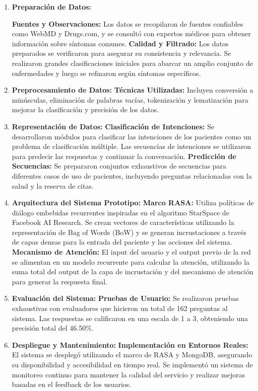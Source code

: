 	\begin{enumerate}
		
		\item \textbf{Preparación de Datos:}
			
			\subitem \textbf{Fuentes y Observaciones:} Los datos se recopilaron de fuentes confiables como WebMD y Drugs.com, y se consultó con expertos médicos para obtener información sobre síntomas comunes.
			\subitem \textbf{Calidad y Filtrado:} Los datos preparados se verificaron para asegurar su consistencia y relevancia. Se realizaron grandes clasificaciones iniciales para abarcar un amplio conjunto de enfermedades y luego se refinaron según síntomas específicos.
		
		\item \textbf{Preprocesamiento de Datos:}
			\subitem \textbf{Técnicas Utilizadas:} Incluyen conversión a minúsculas, eliminación de palabras vacías, tokenización y lematización para mejorar la clasificación y precisión de los datos.
		
		\item \textbf{Representación de Datos:}
			\subitem \textbf{Clasificación de Intenciones:} Se desarrollaron módulos para clasificar las intenciones de los pacientes como un problema de clasificación múltiple. Las secuencias de intenciones se utilizaron para predecir las respuestas y continuar la conversación.
			\subitem \textbf{Predicción de Secuencias:} Se prepararon conjuntos exhaustivos de secuencias para diferentes casos de uso de pacientes, incluyendo preguntas relacionadas con la salud y la reserva de citas.
		
		\item \textbf{Arquitectura del Sistema Prototipo:}
			\subitem \textbf{Marco RASA:} Utiliza políticas de diálogo embebidas recurrentes inspiradas en el algoritmo StarSpace de Facebook AI Research. Se crean vectores de características utilizando la representación de Bag of Words (BoW) y se generan incrustaciones a través de capas densas para la entrada del paciente y las acciones del sistema.
			\subitem \textbf{Mecanismo de Atención:} El input del usuario y el output previo de la red se alimentan en un modelo recurrente para calcular la atención, utilizando la suma total del output de la capa de incrustación y del mecanismo de atención para generar la respuesta final.
		
		\item \textbf{Evaluación del Sistema:}
			\subitem \textbf{Pruebas de Usuario:} Se realizaron pruebas exhaustivas con evaluadores que hicieron un total de 162 preguntas al sistema. Las respuestas se calificaron en una escala de 1 a 3, obteniendo una precisión total del 46.50\%.
		
		\item \textbf{Despliegue y Mantenimiento:}
			\subitem \textbf{Implementación en Entornos Reales:} El sistema se desplegó utilizando el marco de RASA y MongoDB, asegurando su disponibilidad y accesibilidad en tiempo real. Se implementó un sistema de monitoreo continuo para mantener la calidad del servicio y realizar mejoras basadas en el feedback de los usuarios.
	\end{enumerate}

